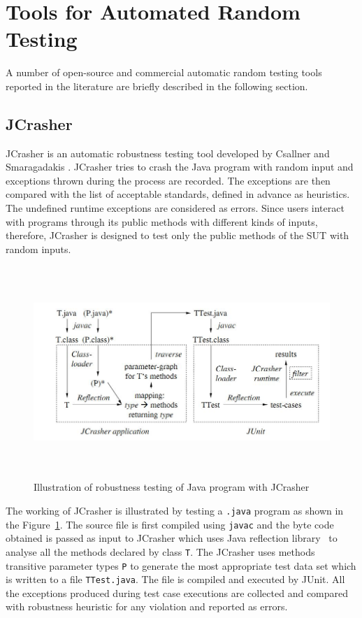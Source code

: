\section{Tools for Automated Random Testing}
A number of open-source and commercial automatic random testing tools reported in the literature are briefly described in the following section.


\subsection{JCrasher}
JCrasher is an automatic robustness testing tool developed by Csallner and Smaragadakis \cite{csallner2004jcrasher}. JCrasher tries to crash the Java program with random input and exceptions thrown during the process are recorded. The exceptions are then compared with the list of acceptable standards, defined in advance as heuristics. The undefined runtime exceptions are considered as errors. Since users interact with programs through its public methods with different kinds of inputs, therefore, JCrasher is designed to test only the public methods of the SUT with random inputs.

\begin{figure}[h]
	\centering
	\includegraphics[width=15cm, height=8cm]{chapter2/JCrasher.png}
	\caption{Illustration of robustness testing of Java program with JCrasher~\cite{csallner2004jcrasher}}
	\label{fig:JCrasher}
\end{figure}

The working of JCrasher is illustrated by testing a \verb+.java+ program as shown in the Figure~\ref{fig:JCrasher}. The source file is first compiled using \verb+javac+ and the byte code obtained is passed as input to JCrasher which uses Java reflection library~\cite{chan1999java} to analyse all the methods declared by class \verb+T+. The JCrasher uses methods transitive parameter types \verb+P+ to generate the most appropriate test data set which is written to a file \verb+TTest.java+. The file is compiled and executed by JUnit. All the exceptions produced during test case executions are collected and compared with robustness heuristic for any violation and reported as errors.

